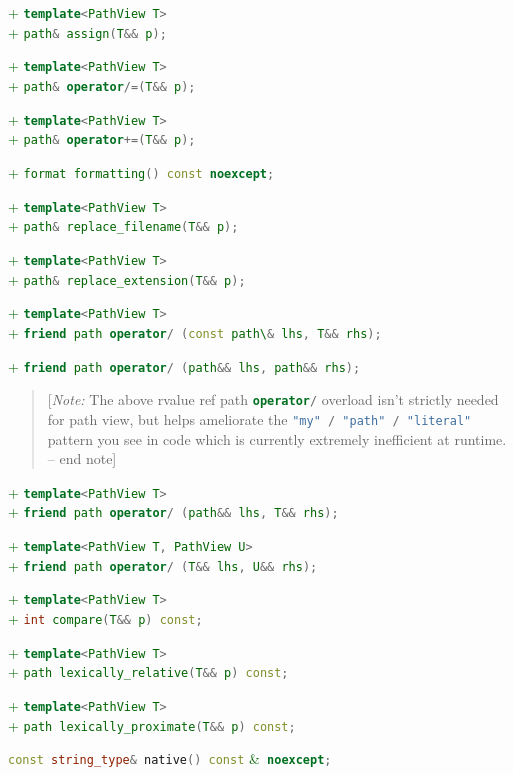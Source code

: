 \documentclass[11pt]{article}
\newcommand{\code}[2][cpp]{\lstinline[language=#1,basicstyle=\small\ttfamily]{#2}}
\newcommand{\note}[1]{\begin{quote}[\textit{Note:} #1 -- end note]\end{quote}}
\newcommand{\tsreplace}[3]{\textcolor{red}{\sout{#1}}#2\textcolor{darkgreen}{#3}}
\begin{document}
\tsreplace{}{}{+ \code{template<PathView T>}}\\
\tsreplace{}{}{+ \code{path& assign(T&& p);}}

\tsreplace{}{}{+ \code{template<PathView T>}}\\
\tsreplace{}{}{+ \code{path& operator/=(T&& p);}}

\tsreplace{}{}{+ \code{template<PathView T>}}\\
\tsreplace{}{}{+ \code{path& operator+=(T&& p);}}

\tsreplace{}{}{+ \code{format formatting() const noexcept;}}

\tsreplace{}{}{+ \code{template<PathView T>}}\\
\tsreplace{}{}{+ \code{path& replace_filename(T&& p);}}

\tsreplace{}{}{+ \code{template<PathView T>}}\\
\tsreplace{}{}{+ \code{path& replace_extension(T&& p);}}

\tsreplace{}{}{+ \code{template<PathView T>}}\\
\tsreplace{}{}{+ \code{friend path operator/ (const path\& lhs, T&& rhs);}}

\tsreplace{}{}{+ \code{friend path operator/ (path&& lhs, path&& rhs);}}

\note{The above rvalue ref path \code{operator/} overload isn't strictly needed for path view, but helps ameliorate the \code{"my" / "path" / "literal"} pattern you see in code which is currently extremely inefficient at runtime.}

\tsreplace{}{}{+ \code{template<PathView T>}}\\
\tsreplace{}{}{+ \code{friend path operator/ (path&& lhs, T&& rhs);}}

\tsreplace{}{}{+ \code{template<PathView T, PathView U>}}\\
\tsreplace{}{}{+ \code{friend path operator/ (T&& lhs, U&& rhs);}}

\tsreplace{}{}{+ \code{template<PathView T>}}\\
\tsreplace{}{}{+ \code{int compare(T&& p) const;}}

\tsreplace{}{}{+ \code{template<PathView T>}}\\
\tsreplace{}{}{+ \code{path lexically_relative(T&& p) const;}}

\tsreplace{}{}{+ \code{template<PathView T>}}\\
\tsreplace{}{}{+ \code{path lexically_proximate(T&& p) const;}}

\code{const string_type& native() const} \tsreplace{}{}{\&}\code{ noexcept;}
\end{document}
